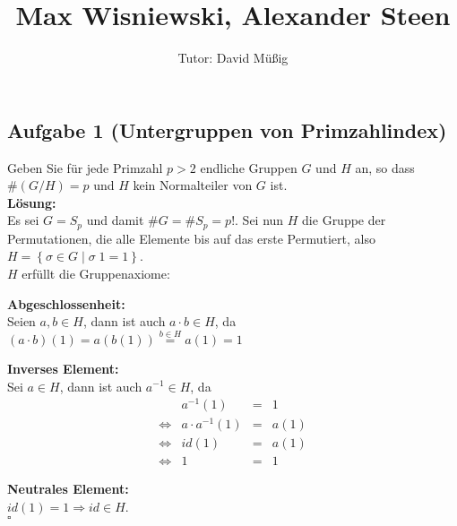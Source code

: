 \documentclass[11pt,a4paper,ngerman]{article}
\author{Tutor: David Müßig}
\date{}
\title{Max Wisniewski, Alexander Steen}
\begin{document}

\maketitle
\thispagestyle{fancy}


\subsection*{Aufgabe 1 \mdseries (Untergruppen von Primzahlindex)}

Geben Sie für jede Primzahl $p > 2$ endliche Gruppen $G$ und $H$ an, so dass $\# (G / H) = p$ und $H$ kein Normalteiler von $G$ ist.\\

\textbf{Lösung:}\\

Es sei $G = S_p$ und damit $\# G = \# S_p = p!$. Sei nun $H$ die Gruppe der Permutationen, die alle Elemente bis auf das erste Permutiert, also $H = \left\{  \sigma \in G \; | \; \sigma \; 1 = 1 \right\}$.\\

$H$ erfüllt die Gruppenaxiome:
\begin{description}
\item{\bfseries Abgeschlossenheit:} \\ Seien $a,b \in H$, dann ist auch $a \cdot b \in H$, da $(a \cdot b)(1) = a(b(1)) \stackrel{b \in H} = a(1) = 1$

\item{\bfseries Inverses Element:} \\ Sei $a \in H$, dann ist auch $a^{-1} \in H$, da
$$
\begin{array}{crcl}
& a^{-1}(1) &=& 1\\
\Leftrightarrow & a\cdot a^{-1} (1) &=& a(1)\\
\Leftrightarrow & id(1) &=& a(1)\\
\Leftrightarrow & 1 &=& 1
\end{array}
$$ 

\item{\bfseries Neutrales Element:} \\ $id(1) = 1 \Rightarrow id \in H$.\\
\mbox{} \hfill $\square$

\end{description}
\end{document}
